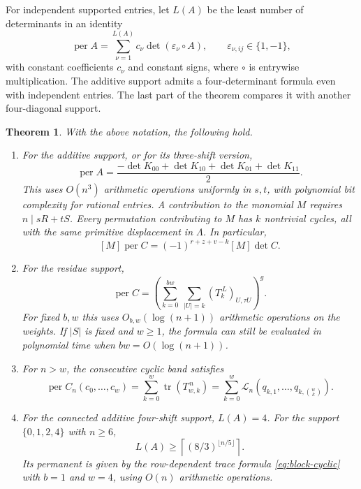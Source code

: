 \documentclass[11pt,reqno]{amsart}
\newtheorem{theorem}{Theorem}[section]
\theoremstyle{remark}
\numberwithin{equation}{section}
\newcommand{\per}{\operatorname{per}}
\newcommand{\tr}{\operatorname{tr}}
\newcommand{\cL}{\mathcal L}
\begin{document}
For independent supported entries, let \(L(A)\) be the least
number of determinants in an identity
\begin{equation}\label{eq:signing-length}
 \per A=\sum_{\nu=1}^{L(A)}c_\nu\det(\varepsilon_\nu\circ A),
 \qquad \varepsilon_{\nu,ij}\in\{1,-1\},
\end{equation}
with constant coefficients \(c_\nu\) and constant signs, where
\(\circ\) is entrywise multiplication. The additive support
admits a four-determinant formula even with independent entries.
The last part of the theorem compares it with another
four-diagonal support.

\begin{theorem}\label{thm:circulant}
With the above notation, the following hold.
\begin{enumerate}
\item For the additive support, or for its three-shift version,
\begin{equation}\label{eq:4det}
 \per A=\frac{-\det K_{00}+\det K_{10}+\det K_{01}+\det K_{11}}{2}.
\end{equation}
This uses \(O(n^3)\) arithmetic operations uniformly in \(s,t\),
with polynomial bit complexity for rational entries. A contribution to the
monomial \(M\) requires \(n\mid sR+tS\). Every permutation
contributing to \(M\) has \(k\) nontrivial cycles, all with the
same primitive displacement in \(\Lambda\). In particular,
\begin{equation}\label{eq:additive-sign}
 [M]\per C=(-1)^{r+z+v-k}[M]\det C .
\end{equation}

\item For the residue support,
\begin{equation}\label{eq:cyclic-residue}
 \per C=\left(\sum_{k=0}^{bw}\ \sum_{|U|=k}
                  (T_k^{\,L})_{U,\tau U}\right)^g .
\end{equation}
For fixed \(b,w\) this uses \(O_{b,w}(\log(n+1))\)
arithmetic operations on the weights. If \(|S|\) is fixed and
\(w\ge1\), the formula can still be evaluated in polynomial time
when \(bw=O(\log(n+1))\).

\item For \(n>w\), the consecutive cyclic band satisfies
\begin{equation}\label{eq:cyclic}
 \per C_n(c_0,\ldots,c_w)
  =\sum_{k=0}^w\tr(T_{w,k}^{\,n})
  =\sum_{k=0}^w\cL_n(q_{k,1},\ldots,q_{k,\binom wk}).
\end{equation}

\item For the connected additive four-shift support, \(L(A)=4\).
For the support \(\{0,1,2,4\}\) with \(n\ge6\),
\[
 L(A)\ge\left\lceil(8/3)^{\lfloor n/5\rfloor}\right\rceil.
\]
Its permanent is given by the row-dependent trace formula
\eqref{eq:block-cyclic} with \(b=1\) and \(w=4\), using \(O(n)\)
arithmetic operations.
\end{enumerate}
\end{theorem}
\end{document}

